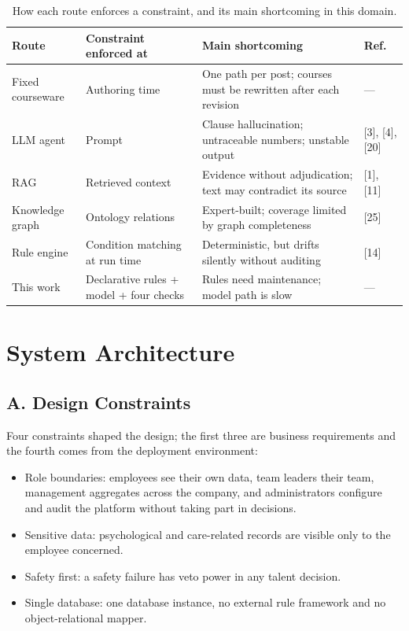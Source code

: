 \documentclass[conference]{IEEEtran}
\begin{document}
\begin{table}[t]
\caption{How each route enforces a constraint, and its main shortcoming in this domain.}
\centering
\footnotesize
\begin{tabular}{@{}p{}p{}p{}p{}@{}}
\hline
\textbf{Route} & \textbf{Constraint enforced at} & \textbf{Main shortcoming} & \textbf{Ref.} \\ \hline
Fixed courseware & Authoring time & One path per post; courses must be rewritten after each revision & --- \\
LLM agent & Prompt & Clause hallucination; untraceable numbers; unstable output & [3], [4], [20] \\
RAG & Retrieved context & Evidence without adjudication; text may contradict its source & [1], [11] \\
Knowledge graph & Ontology relations & Expert-built; coverage limited by graph completeness & [25] \\
Rule engine & Condition matching at run time & Deterministic, but drifts silently without auditing & [14] \\
This work & Declarative rules + model + four checks & Rules need maintenance; model path is slow & --- \\
\hline
\end{tabular}
\end{table}

\section{System Architecture}

\subsection{A. Design Constraints}

Four constraints shaped the design; the first three are business requirements and the fourth comes from the deployment environment:


\begin{itemize}

\item Role boundaries: employees see their own data, team leaders their team, management aggregates across the company, and administrators configure and audit the platform without taking part in decisions.

\item Sensitive data: psychological and care-related records are visible only to the employee concerned.

\item Safety first: a safety failure has veto power in any talent decision.

\item Single database: one database instance, no external rule framework and no object-relational mapper.

\end{itemize}
\end{document}
